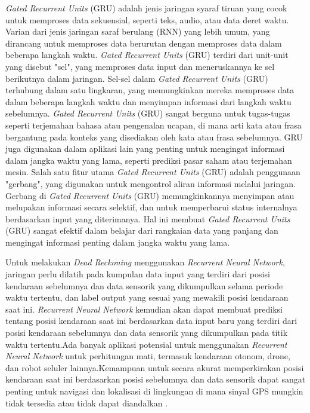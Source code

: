 \emph{Gated Recurrent Units} (GRU) adalah jenis jaringan syaraf tiruan yang cocok untuk memproses data sekuensial, seperti teks, audio, atau data deret waktu. Varian dari jenis jaringan saraf berulang (RNN) yang 
lebih umum, yang dirancang untuk memproses data berurutan dengan memproses data dalam beberapa langkah waktu. \emph{Gated Recurrent Units} (GRU) terdiri dari unit-unit yang disebut "sel", yang memproses data input 
dan meneruskannya ke sel berikutnya dalam jaringan. Sel-sel dalam \emph{Gated Recurrent Units} (GRU) terhubung dalam satu lingkaran, yang memungkinkan mereka memproses data dalam beberapa langkah waktu dan menyimpan 
informasi dari langkah waktu sebelumnya. \emph{Gated Recurrent Units} (GRU) sangat berguna untuk tugas-tugas seperti terjemahan bahasa atau pengenalan ucapan, di mana arti kata atau frasa bergantung pada konteks 
yang disediakan oleh kata atau frasa sebelumnya. GRU juga digunakan dalam aplikasi lain yang penting untuk mengingat informasi dalam jangka waktu yang lama, seperti prediksi pasar saham atau terjemahan mesin. Salah 
satu fitur utama \emph{Gated Recurrent Units} (GRU) adalah penggunaan "gerbang", yang digunakan untuk mengontrol aliran informasi melalui jaringan. Gerbang di \emph{Gated Recurrent Units} (GRU) memungkinkannya 
menyimpan atau melupakan informasi secara selektif, dan untuk memperbarui status internalnya berdasarkan input yang diterimanya. Hal ini membuat \emph{Gated Recurrent Units} (GRU) sangat efektif dalam belajar dari 
rangkaian data yang panjang dan mengingat informasi penting dalam jangka waktu yang lama. \parencite{Dey2017}

Untuk melakukan \emph{Dead Reckoning} menggunakan \emph{Recurrent Neural Network}, jaringan perlu dilatih pada kumpulan data input yang terdiri dari posisi kendaraan sebelumnya dan data sensorik yang dikumpulkan 
selama periode waktu tertentu, dan label output yang sesuai yang mewakili posisi kendaraan saat ini. \emph{Recurrent Neural Network}  kemudian akan dapat membuat prediksi tentang posisi kendaraan saat ini 
berdasarkan data input baru yang terdiri dari posisi kendaraan sebelumnya dan data sensorik yang dikumpulkan pada titik waktu tertentu.Ada banyak aplikasi potensial untuk menggunakan \emph{Recurrent Neural Network}  
untuk perhitungan mati, termasuk kendaraan otonom, drone, dan robot seluler lainnya.Kemampuan untuk secara akurat memperkirakan posisi kendaraan saat ini berdasarkan posisi sebelumnya dan data sensorik dapat sangat 
penting untuk navigasi dan lokalisasi di lingkungan di mana sinyal GPS mungkin tidak tersedia atau tidak dapat diandalkan \parencite{Albawi2017}. 

